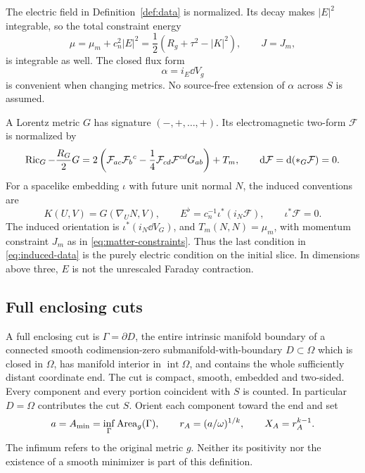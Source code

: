The electric field in Definition~\ref{def:data} is normalized. Its decay makes $|E|^2$ integrable, so the total constraint energy
\begin{equation}\label{eq:total-constraints}
 \mu=\mu_m+c_n^2|E|^2=\frac12(R_g+\tau^2-|K|^2),
 \qquad J=J_m,
\end{equation}
is integrable as well. The closed flux form
\begin{equation}\label{eq:electric-flux-form}
 \alpha=i_E\dd V_g
\end{equation}
is convenient when changing metrics. No source-free extension of $\alpha$ across $S$ is assumed.

\begin{definition}\label{def:normalization}
A Lorentz metric $G$ has signature $(-,+,\ldots,+)$. Its electromagnetic two-form $\mathcal F$ is normalized by
\begin{equation}\label{eq:einstein-maxwell}
 \operatorname{Ric}_G-\frac{R_G}2G
 =2\left(\mathcal F_{ac}\mathcal F_b{}^c
           -\frac14\mathcal F_{cd}\mathcal F^{cd}G_{ab}\right)+T_m,
 \qquad \mathrm d\mathcal F=\mathrm d(*_G\mathcal F)=0.
\end{equation}
For a spacelike embedding $\iota$ with future unit normal $N$, the induced conventions are
\begin{equation}\label{eq:induced-data}
 K(U,V)=G(\nabla_U N,V),\qquad
 E^\flat=c_n^{-1}\iota^*(i_N\mathcal F),\qquad
 \iota^*\mathcal F=0.
\end{equation}
The induced orientation is $\iota^*(i_N\dd V_G)$, and $T_m(N,N)=\mu_m$, with momentum constraint $J_m$ as in \eqref{eq:matter-constraints}. Thus the last condition in \eqref{eq:induced-data} is the purely electric condition on the initial slice. In dimensions above three, $E$ is not the unrescaled Faraday contraction.
\end{definition}

\subsection{Full enclosing cuts}

\begin{definition}\label{def:full-cut}
A full enclosing cut is $\Gamma=\partial D$, the entire intrinsic manifold boundary of a connected smooth codimension-zero submanifold-with-boundary $D\subset\Omega$ which is closed in $\Omega$, has manifold interior in $\operatorname{int}\Omega$, and contains the whole sufficiently distant coordinate end. The cut is compact, smooth, embedded and two-sided. Every component and every portion coincident with $S$ is counted. In particular $D=\Omega$ contributes the cut $S$.
Orient each component toward the end and set
\begin{equation}\label{eq:enclosing-area}
 a=A_{\min}=\inf_\Gamma\operatorname{Area}_g(\Gamma),\qquad
 r_A=(a/\omega)^{1/k},\qquad X_A=r_A^{k-1}.
\end{equation}
The infimum refers to the original metric $g$. Neither its positivity nor the existence of a smooth minimizer is part of this definition.
\end{definition}

